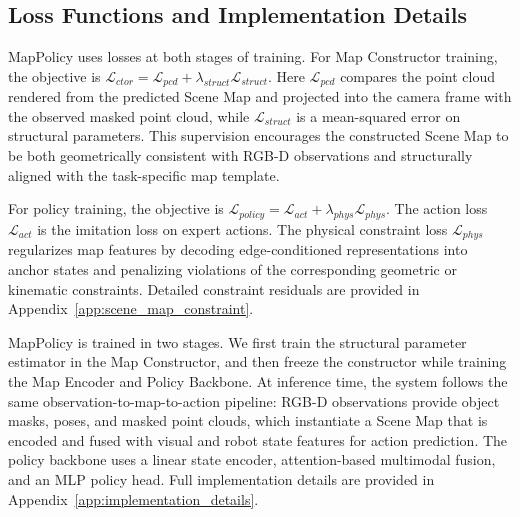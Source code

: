 \subsection{Loss Functions and Implementation Details}
\label{sec:loss_functions}
\label{sec:implementation_details}

MapPolicy uses losses at both stages of training. For Map Constructor training, the objective is $\mathcal{L}_{ctor}=\mathcal{L}_{pcd}+\lambda_{struct}\mathcal{L}_{struct}$. Here $\mathcal{L}_{pcd}$ compares the point cloud rendered from the predicted Scene Map and projected into the camera frame with the observed masked point cloud, while $\mathcal{L}_{struct}$ is a mean-squared error on structural parameters. This supervision encourages the constructed Scene Map to be both geometrically consistent with RGB-D observations and structurally aligned with the task-specific map template.

For policy training, the objective is $\mathcal{L}_{policy}=\mathcal{L}_{act}+\lambda_{phys}\mathcal{L}_{phys}$. The action loss $\mathcal{L}_{act}$ is the imitation loss on expert actions. The physical constraint loss $\mathcal{L}_{phys}$ regularizes map features by decoding edge-conditioned representations into anchor states and penalizing violations of the corresponding geometric or kinematic constraints. Detailed constraint residuals are provided in Appendix~\ref{app:scene_map_constraint}.

MapPolicy is trained in two stages. We first train the structural parameter estimator in the Map Constructor, and then freeze the constructor while training the Map Encoder and Policy Backbone. At inference time, the system follows the same observation-to-map-to-action pipeline: RGB-D observations provide object masks, poses, and masked point clouds, which instantiate a Scene Map that is encoded and fused with visual and robot state features for action prediction. The policy backbone uses a linear state encoder, attention-based multimodal fusion, and an MLP policy head. Full implementation details are provided in Appendix~\ref{app:implementation_details}.
